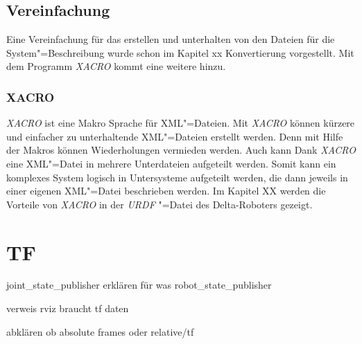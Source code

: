 \subsection{Vereinfachung}
Eine Vereinfachung für das erstellen und unterhalten von den Dateien für die System"=Beschreibung wurde schon im Kapitel xx Konvertierung vorgestellt. %
Mit dem Programm \textit{XACRO} kommt eine weitere hinzu. 

\subsubsection{XACRO}
\textit{XACRO} ist eine Makro Sprache für XML"=Dateien. %
Mit \textit{XACRO} können kürzere und einfacher zu unterhaltende XML"=Dateien erstellt werden.
Denn mit Hilfe der Makros können Wiederholungen vermieden werden.
Auch kann Dank \textit{XACRO} eine XML"=Datei in mehrere Unterdateien aufgeteilt werden.
Somit kann ein komplexes System logisch in Untersysteme aufgeteilt werden, die dann jeweils in einer eigenen XML"=Datei beschrieben werden. 
Im Kapitel XX werden die Vorteile von \textit{XACRO} in der \textit{URDF} "=Datei des Delta-Roboters gezeigt.

\section{TF}
joint_state_publisher erklären für was
robot_state_publisher

verweis rviz braucht tf daten

abklären ob absolute frames oder relative/tf

